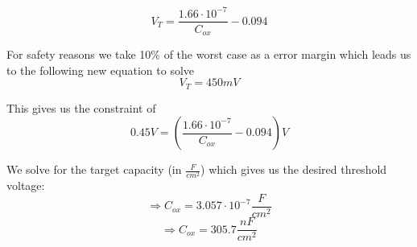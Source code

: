  \begin{equation}
V_T= \frac{1.66 \cdot 10^{-7}}{C_{ox}}-0.094
\end{equation}

For safety reasons we take 10\% of the worst case as a error margin which leads us to the following new equation to solve
 \begin{equation}
V_T = 450mV
\end{equation}

This gives us the constraint of
\begin{equation}
0.45 V = \left( \frac{1.66 \cdot 10^{-7}}{C_{ox}}-0.094 \right) V
\end{equation}

We solve for the target capacity (in $\frac{F}{cm^2}$) which gives us the desired threshold voltage:
\begin{equation}
\Rightarrow
C_{ox}
=
3.057 \cdot {10}^{-7} \frac{F}{cm^2}
\end{equation}
\begin{equation}
\Rightarrow
C_{ox}
=
305.7 \frac{nF}{cm^2}
\end{equation}
